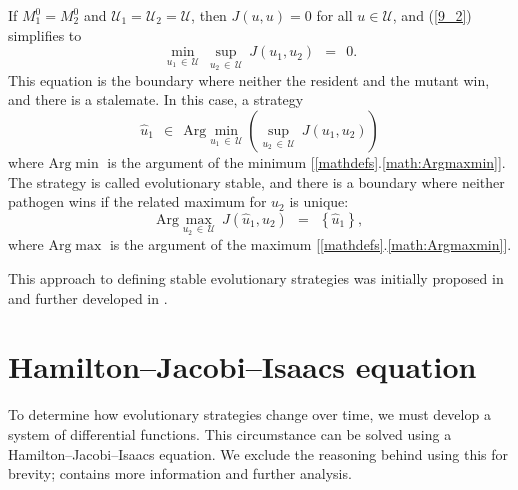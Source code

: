 \documentclass[11pt]{amsart}
\begin{document}
If $ M_1^0 = M_2^0 $ and $ \mathcal{U}_1 = \mathcal{U}_2 = \mathcal{U} ${\rm ,}
then $ J(u, u) = 0 $ for all $ u \in \mathcal{U} ${\rm ,} and {\rm (\ref{9_2})}
simplifies to
\begin{equation}
\min_{u_1 \, \in \, \mathcal{U}} \: \sup_{u_2 \, \in \, \mathcal{U}} \:
  J(u_1, u_2) \:\: = \:\: 0  \label{9_3}.
\end{equation}
This equation is the boundary where neither the resident and the mutant win, and there is a stalemate.
In this case{\rm ,} a strategy
$$
\hat{u}_1 \:\: \in \:\: \mathrm{Arg} \min_{u_1 \, \in \, \mathcal{U}}
  \left( \sup_{u_2 \, \in \, \mathcal{U}} \: J(u_1, u_2) \right)
$$
where $\mathrm{Arg} \min$ is the argument of the minimum [\ref{mathdefs}.\ref{math:Argmaxmin}]. The strategy is called evolutionary stable, and there is a boundary where neither pathogen wins if the related maximum for $ u_2 $ is
unique:
$$
\mathrm{Arg} \max_{u_2 \, \in \, \mathcal{U}} \: J \left( \hat{u}_1, u_2
  \right) \:\: = \:\: \left\{ \hat{u}_1 \right\},
$$
where $\mathrm{Arg}\max$ is the argument of the maximum [\ref{mathdefs}.\ref{math:Argmaxmin}].


This approach to defining stable evolutionary strategies was initially proposed
in \cite{BernhardGrognardMailleretAkhmetzhanov2010} and further developed
in \cite{YegorovGrognardMailleretHalkettBernhard2019}.


\section{Hamilton--Jacobi--Isaacs equation}
To determine how evolutionary strategies change over time, we must develop a system of differential functions. This circumstance can be solved using a Hamilton--Jacobi--Isaacs equation. We exclude the reasoning behind using this for brevity; \cite{YegorovGrognardMailleretHalkettBernhard2019} contains more information and further analysis.
\end{document}
